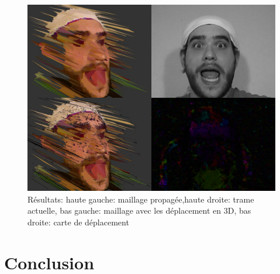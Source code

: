 \documentclass[a4paper,12pt]{article}
\begin{document}
 
\begin{figure}[ht!]
  \begin{center}
    \includegraphics[scale=0.4]{img/frame10}
    \caption{Résultats: haute gauche: maillage propagée,haute droite:
      trame actuelle, bas gauche: maillage avec les déplacement en 3D,
      bas droite: carte de déplacement }
    \label{fig:result}
  \end{center}
\end{figure}

\newpage
\section{Conclusion}


% 
% 
\end{document}
